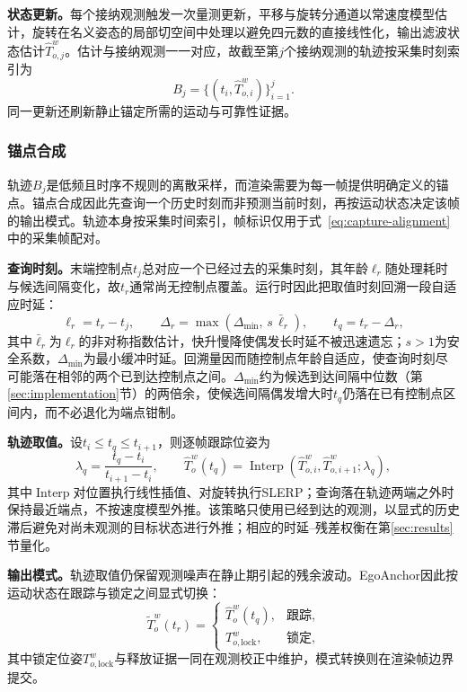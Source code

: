 \documentclass[review]{vgtc}
\begin{document}
\textbf{状态更新。}每个接纳观测触发一次量测更新，平移与旋转分通道以常速度模型估计，旋转在名义姿态的局部切空间中处理以避免四元数的直接线性化，输出滤波状态估计$\widehat{T}_{o,j}^{w}$。估计与接纳观测一一对应，故截至第$j$个接纳观测的轨迹按采集时刻索引为
\begin{equation}
B_j = \{(t_i, \widehat{T}_{o,i}^{w})\}_{i=1}^{j}.
\label{eq:trajectory}
\end{equation}
同一更新还刷新静止锚定所需的运动与可靠性证据。

\subsubsection{锚点合成}\label{sec:frame-output}

轨迹$B_j$是低频且时序不规则的离散采样，而渲染需要为每一帧提供明确定义的锚点。锚点合成因此先查询一个历史时刻而非预测当前时刻，再按运动状态决定该帧的输出模式。轨迹本身按采集时间索引，帧标识仅用于式~\eqref{eq:capture-alignment}中的采集帧配对。

\textbf{查询时刻。}末端控制点$t_j$总对应一个已经过去的采集时刻，其年龄$\ell_r$随处理耗时与候选间隔变化，故$t_r$通常尚无控制点覆盖。运行时因此把取值时刻回溯一段自适应时延：
\begin{equation}
\ell_r = t_r - t_j, \qquad \Delta_r = \max(\Delta_{\min},\, s\,\bar{\ell}_r), \qquad t_q = t_r - \Delta_r,
\label{eq:target-time}
\end{equation}
其中$\bar{\ell}_r$为$\ell_r$的非对称指数估计，快升慢降使偶发长时延不被迅速遗忘；$s>1$为安全系数，$\Delta_{\min}$为最小缓冲时延。回溯量因而随控制点年龄自适应，使查询时刻尽可能落在相邻的两个已到达控制点之间。$\Delta_{\min}$约为候选到达间隔中位数（第\ref{sec:implementation}节）的两倍余，使候选间隔偶发增大时$t_q$仍落在已有控制点区间内，而不必退化为端点钳制。

\textbf{轨迹取值。}设$t_i \leq t_q \leq t_{i+1}$，则逐帧跟踪位姿为
\begin{equation}
\lambda_q = \frac{t_q - t_i}{t_{i+1} - t_i}, \qquad \widehat{T}_o^w(t_q) = \operatorname{Interp}(\widehat{T}_{o,i}^{w}, \widehat{T}_{o,i+1}^{w}; \lambda_q),
\label{eq:delayed-interp}
\end{equation}
其中$\operatorname{Interp}$对位置执行线性插值、对旋转执行SLERP；查询落在轨迹两端之外时保持最近端点，不按速度模型外推。该策略只使用已经到达的观测，以显式的历史滞后避免对尚未观测的目标状态进行外推；相应的时延--残差权衡在第\ref{sec:results}节量化。

\textbf{输出模式。}轨迹取值仍保留观测噪声在静止期引起的残余波动。EgoAnchor因此按运动状态在跟踪与锁定之间显式切换：
\begin{equation}
\widetilde{T}_o^w(t_r) = \begin{cases}
\widehat{T}_o^w(t_q), & \text{跟踪}, \\
T_{o,\mathrm{lock}}^w, & \text{锁定},
\end{cases}
\label{eq:staticlock}
\end{equation}
其中锁定位姿$T_{o,\mathrm{lock}}^w$与释放证据一同在观测校正中维护，模式转换则在渲染帧边界提交。
\end{document}
